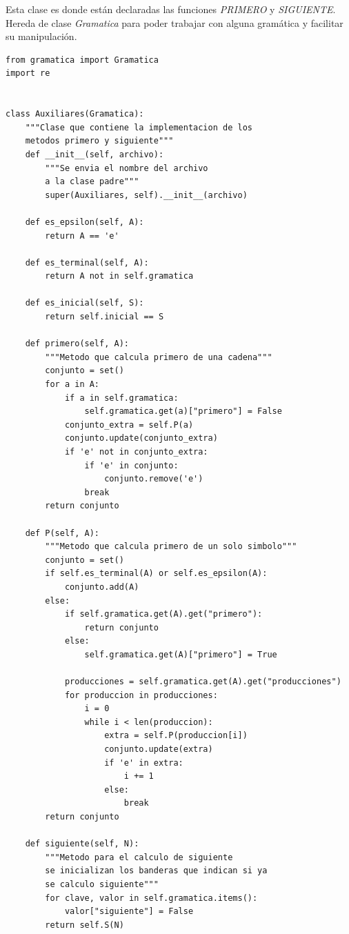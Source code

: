 \documentclass[12pt, titlepage]{article}
\begin{document}
    Esta clase es donde están declaradas las funciones \emph{PRIMERO} y 
\emph{SIGUIENTE}. Hereda de clase \emph{Gramatica} para poder trabajar con 
alguna gramática y facilitar su manipulación.
    \begin{lstlisting}[title=Archivo: auxiliares.py]
from gramatica import Gramatica
import re


class Auxiliares(Gramatica):
    """Clase que contiene la implementacion de los
    metodos primero y siguiente"""
    def __init__(self, archivo):
        """Se envia el nombre del archivo
        a la clase padre"""
        super(Auxiliares, self).__init__(archivo)

    def es_epsilon(self, A):
        return A == 'e'

    def es_terminal(self, A):
        return A not in self.gramatica

    def es_inicial(self, S):
        return self.inicial == S

    def primero(self, A):
        """Metodo que calcula primero de una cadena"""
        conjunto = set()
        for a in A:
            if a in self.gramatica:
                self.gramatica.get(a)["primero"] = False
            conjunto_extra = self.P(a)
            conjunto.update(conjunto_extra)
            if 'e' not in conjunto_extra:
                if 'e' in conjunto:
                    conjunto.remove('e')
                break
        return conjunto

    def P(self, A):
        """Metodo que calcula primero de un solo simbolo"""
        conjunto = set()
        if self.es_terminal(A) or self.es_epsilon(A):
            conjunto.add(A)
        else:
            if self.gramatica.get(A).get("primero"):
                return conjunto
            else:
                self.gramatica.get(A)["primero"] = True

            producciones = self.gramatica.get(A).get("producciones")
            for produccion in producciones:
                i = 0
                while i < len(produccion):
                    extra = self.P(produccion[i])
                    conjunto.update(extra)
                    if 'e' in extra:
                        i += 1
                    else:
                        break
        return conjunto

    def siguiente(self, N):
        """Metodo para el calculo de siguiente
        se inicializan los banderas que indican si ya
        se calculo siguiente"""
        for clave, valor in self.gramatica.items():
            valor["siguiente"] = False
        return self.S(N)


\end{lstlisting}
\end{document}
